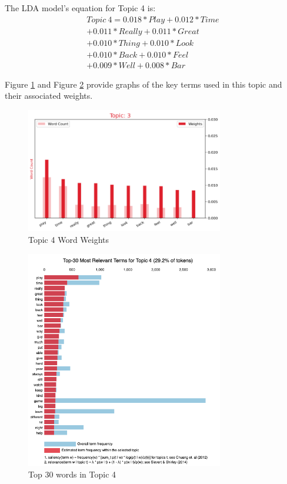 \documentclass[5p,authoryear]{elsarticle}
\begin{document}
The LDA model's equation for Topic 4 is:
\begin{align*}
    Topic\ 4 = 0.018*Play + 0.012*Time \\
    + 0.011*Really + 0.011*Great \\
    + 0.010*Thing + 0.010*Look \\
    + 0.010*Back + 0.010*Feel \\
    + 0.009*Well + 0.008*Bar
    \label{eq:4}
\end{align*}


Figure \ref{weights4} and Figure \ref{words4} provide graphs of the key terms used in this topic and their associated weights.


\begin{figure}[!htb] \centering
	\includegraphics[width=3.4in]{figures/Topic3_words.png}
	\caption[]{Topic 4 Word Weights} 
	\label{weights4} 
\end{figure}


\begin{figure}[!htb] \centering
	\includegraphics[width=3.4in]{figures/top_topic4.png}
	\caption[]{Top 30 words in Topic 4} 
	\label{words4} 
\end{figure}
\end{document}
